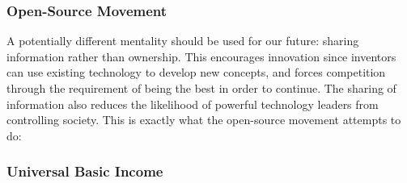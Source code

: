\subsubsection{Open-Source Movement} \label{subsec:open-source}
A potentially different mentality should be used for our future: sharing information rather than ownership. This encourages innovation since inventors can use existing technology to develop new concepts, and forces competition through the requirement of being the best in order to continue. The sharing of information also reduces the likelihood of powerful technology leaders from controlling society. This is exactly what the open-source movement attempts to do: 

\subsubsection{Universal Basic Income}

